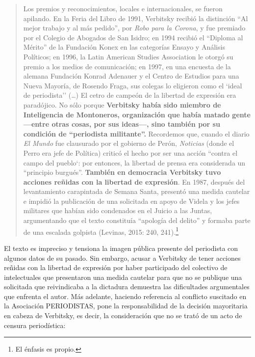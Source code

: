 \begin{quote}
Los premios y reconocimientos, locales e internacionales, se fueron apilando. En la Feria del Libro de 1991, Verbitsky recibió la distinción ``Al mejor trabajo y al más pedido'', por \emph{Robo para la Corona}, y fue premiado por el Colegio de Abogados de San Isidro; en 1994 recibió el ``Diploma al Mérito'' de la Fundación Konex en las categorías Ensayo y Análisis Políticos; en 1996, la Latin American Studies Association le otorgó su premio a los medios de comunicación; en 1997, en una encuesta de la alemana Fundación Konrad Adenauer y el Centro de Estudios para una Nueva Mayoría, de Rosendo Fraga, sus colegas lo eligieron como el `ideal de periodista'' (\ldots) El cetro de campeón de la libertad de expresión era paradójico. No sólo porque \textbf{Verbitsky había sido miembro de Inteligencia de Montoneros, organización que había matado gente ---entre otras cosas, por sus ideas---, sino también por su condición de ``periodista militante''.} Recordemos que, cuando el diario \emph{El Mundo} fue clausurado por el gobierno de Perón, \emph{Noticias} (donde el Perro era jefe de Política) criticó el hecho por ser una acción ``contra el campo del pueblo`: por entonces, la libertad de prensa era considerada un ``principio burgués''. \textbf{También en democracia Verbitsky tuvo acciones reñidas con la libertad de expresión}. En 1987, después del levantamiento carapintada de Semana Santa, presentó una medida cautelar e impidió la publicación de una solicitada en apoyo de Videla y los jefes militares que habían sido condenados en el Juicio a las Juntas, argumentando que el texto constituía ``apología del delito'' y formaba parte de una escalada golpista (Levinas, 2015: 240, 241).\footnote{El énfasis es propio.}
\end{quote}

El texto es impreciso y tensiona la imagen pública presente del periodista con algunos datos de su pasado. Sin embargo, acusar a Verbitsky de tener acciones reñidas con la libertad de expresión por haber participado del colectivo de intelectuales que presentaron una medida cautelar para que no se publique una solicitada que reivindicaba a la dictadura demuestra las dificultades argumentales que enfrenta el autor. Más adelante, haciendo referencia al conflicto suscitado en la Asociación PERIODISTAS, pone la responsabilidad de la decisión mayoritaria en cabeza de Verbitsky, es decir, la consideración que no se trató de un acto de censura periodística:

